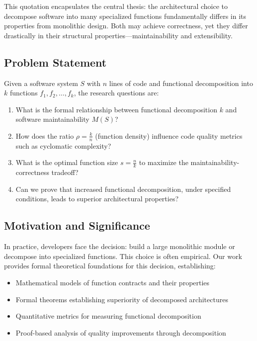 \documentclass[a4paper,12pt]{article}
\theoremstyle{definition}
\begin{document}
This quotation encapsulates the central thesis: the architectural choice to decompose software into many specialized functions fundamentally differs in its properties from monolithic design. Both may achieve correctness, yet they differ drastically in their structural properties—maintainability and extensibility.

\subsection{Problem Statement}

Given a software system $S$ with $n$ lines of code and functional decomposition into $k$ functions $f_1, f_2, \ldots, f_k$, the research questions are:

\begin{enumerate}
	\item What is the formal relationship between functional decomposition $k$ and software maintainability $M(S)$?
	\item How does the ratio $\rho = \frac{k}{n}$ (function density) influence code quality metrics such as cyclomatic complexity?
	\item What is the optimal function size $s = \frac{n}{k}$ to maximize the maintainability-correctness tradeoff?
	\item Can we prove that increased functional decomposition, under specified conditions, leads to superior architectural properties?
\end{enumerate}

\subsection{Motivation and Significance}

In practice, developers face the decision: build a large monolithic module or decompose into specialized functions. This choice is often empirical. Our work provides formal theoretical foundations for this decision, establishing:

\begin{itemize}
	\item Mathematical models of function contracts and their properties
	\item Formal theorems establishing superiority of decomposed architectures
	\item Quantitative metrics for measuring functional decomposition
	\item Proof-based analysis of quality improvements through decomposition
\end{itemize}
\end{document}
